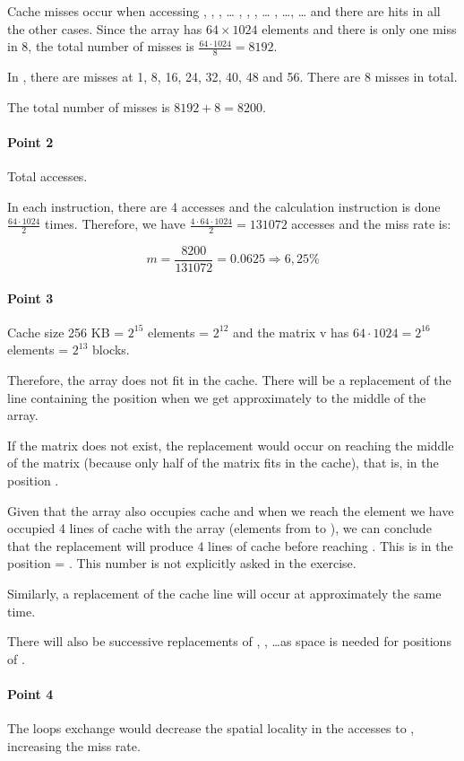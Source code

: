 Cache misses occur when accessing
, , , \ldots 
{}, , , \ldots
\cppid{[2,0]}, \ldots {}, \ldots 
and there are hits in all the other cases. Since the array has $64 \times 1024$ 
elements and there is only one miss in 8, the total number of misses is $\frac{64 \cdot 1024}{8} = 8192$.

In , there are misses at 1, 8, 16, 24, 32, 40, 48 and 56.
There are 8 misses in total.

The total number of misses is $8192 + 8 = 8200$.

\paragraph{Point 2}

Total accesses.

In each instruction, there are 4 accesses and the calculation instruction is 
done $\frac{64 \cdot 1024}{2}$ times. Therefore, we have $\frac{4 \cdot 64 \cdot 1024}{2} = 131072$ accesses and the miss rate is:

\[
m = \frac{8200}{131072} = 0.0625 \Rightarrow 6,25 \%
\] 

\paragraph{Point 3}

Cache size 256 KB = $2^{15}$ elements = $2^{12}$ and the matrix v 
has $64 \cdot 1024 = 2^{16}$ elements = $2^{13}$ blocks.

Therefore,  the  array does not fit in the cache. There will be a replacement 
of the line containing the  position when we get approximately 
to the middle of the  array.

If the matrix  does not exist, the replacement would occur on reaching 
the middle of the matrix (because only half of the matrix fits in the cache), that is, 
in the position  .

Given that the array  also occupies cache and when we reach the element 
 we have occupied 4 lines of cache with the array  (elements from 
 to ), we can conclude that the replacement will 
produce 4 lines of cache before reaching . This is in the position 
 = .  This number is not 
explicitly asked in the exercise.

Similarly, a replacement of the  cache line will occur at approximately 
the same time.

There will also be successive replacements of , , 
\ldots as space is needed for positions of .

\paragraph{Point 4}

The loops exchange would decrease the spatial locality in the accesses 
to , increasing the miss rate.
